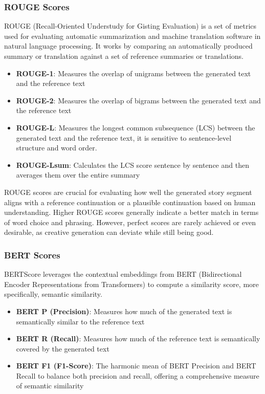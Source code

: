\documentclass[11pt]{article}
\begin{document}
\subsubsection{ROUGE Scores}
ROUGE (Recall-Oriented Understudy for Gisting Evaluation) is a set of metrics used for evaluating automatic summarization and machine translation software in natural language processing. It works by comparing an automatically produced summary or translation against a set of reference summaries or translations.

\begin{itemize}
    \item \textbf{ROUGE-1}: Measures the overlap of unigrams between the generated text and the reference text
    \item \textbf{ROUGE-2}: Measures the overlap of bigrams between the generated text and the reference text
    \item \textbf{ROUGE-L}: Measures the longest common subsequence (LCS) between the generated text and the reference text, it is sensitive to sentence-level structure and word order.
    \item \textbf{ROUGE-Lsum}: Calculates the LCS score sentence by sentence and then averages them over the entire summary
\end{itemize}

ROUGE scores are crucial for evaluating how well the generated story segment aligns with a reference continuation or a plausible continuation based on human understanding. Higher ROUGE scores generally indicate a better match in terms of word choice and phrasing.
However, perfect scores are rarely achieved or even desirable, as creative generation can deviate while still being good.

\subsubsection{BERT Scores}
BERTScore leverages the contextual embeddings from BERT (Bidirectional Encoder Representations from Transformers) to compute a similarity score, more specifically, semantic similarity.

\begin{itemize}
    \item \textbf{BERT P (Precision)}: Measures how much of the generated text is semantically similar to the reference text
    \item \textbf{BERT R (Recall)}: Measures how much of the reference text is semantically covered by the generated text
    \item \textbf{BERT F1 (F1-Score)}: The harmonic mean of BERT Precision and BERT Recall to balance both precision and recall, offering a comprehensive measure of semantic similarity
\end{itemize}
\end{document}
